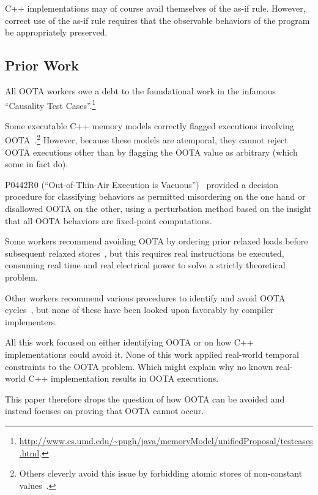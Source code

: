 \documentclass[10]{article}
\begin{document}
C++ implementations may of course avail themselves of the as-if rule.
However, correct use of the as-if rule requires that the observable
behaviors of the program be appropriately preserved.

\subsection{Prior Work}
\label{sec:Prior Work}

All OOTA workers owe a debt to the foundational work in the infamous
``Causality Test Cases''.\footnote{
	\url{http://www.cs.umd.edu/~pugh/java/memoryModel/unifiedProposal/testcases.html}.}

Some executable C++ memory models correctly flagged executions involving
OOTA~\cite{JadeAlglave2014HerdingCats}.\footnote{
	Others cleverly avoid this issue by forbidding atomic
	stores of non-constant values~\cite{MarkBatty2011cppmem}.}
However, because these models are atemporal, they cannot reject
OOTA executions other than by flagging the OOTA value as arbitrary
(which some in fact do).

P0442R0 (``Out-of-Thin-Air Execution is Vacuous'')~\cite{PaulEMcKenney2016OOTA}
provided a decision procedure for classifying behaviors as permitted
misordering on the one hand or disallowed OOTA on the other, using
a perturbation method based on the insight that all OOTA behaviors are
fixed-point computations.

Some workers recommend avoiding OOTA by ordering prior relaxed
loads before subsequent relaxed
stores~\cite{Boehm:2014:OGA:2618128.2618134,HansBoehm2019OOTArevisitedAgain,Lahav:2017:RSC:3062341.3062352},
but this requires real instructions be executed, consuming real
time and real electrical power to solve a strictly theoretical
problem.

Other workers recommend various procedures to identify and avoid OOTA
cycles~\cite{Lahav:2017:RSC:3062341.3062352,Sinclair:2017:CAR:3079856.3080206,Lee:10.1145/3385412.3386010,MarkBatty2019ModularRelaxedDependenciesOOTA},
but none of these have been looked upon favorably by compiler implementers.

All this work focused on either identifying OOTA or on how C++
implementations could avoid it.
None of this work applied real-world temporal constraints to the OOTA
problem.
Which might explain why no known real-world C++ implementation results
in OOTA executions.

This paper therefore drops the question of how OOTA can be avoided and
instead focuses on proving that OOTA cannot occur.
\end{document}
